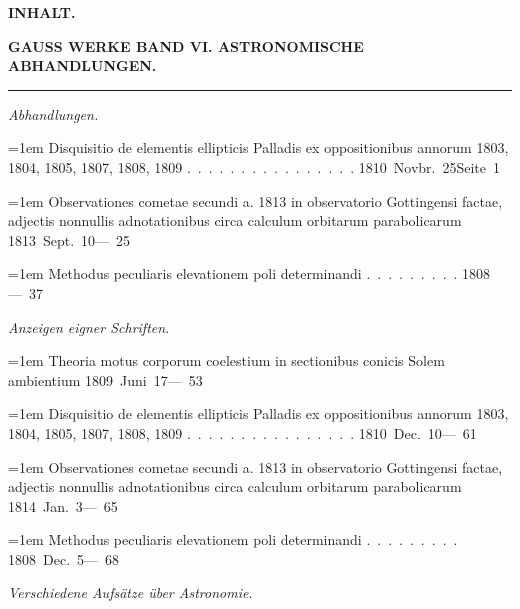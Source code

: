 \clearpage
\begingroup
\pagestyle{empty}
\thispagestyle{empty}
\begingroup
\raggedright
\begin{center}\textbf{INHALT.}\par\medskip
\textbf{GAUSS WERKE BAND VI. ASTRONOMISCHE ABHANDLUNGEN.}\par\medskip
\rule{.07\textwidth}{.3pt}\end{center}
\par\medskip
\noindent\textit{Abhandlungen.}\par\smallskip\nopagebreak[4]
\noindent\hangindent=1em Disquisitio de elementis ellipticis Palladis ex oppositionibus annorum 1803, 1804, 1805, 1807, 1808, 1809 \mbox{.\ .\ .\ .\ .\ .\ .\ .\ .\ .\ .\ .\ .\ .\ .\ .} \hfill\mbox{1810 Novbr. 25}\quad\mbox{Seite 1}\par\smallskip
\noindent\hangindent=1em Observationes cometae secundi a. 1813 in observatorio Gottingensi factae, adjectis nonnullis adnotationibus circa calculum orbitarum parabolicarum \hfill\mbox{1813 Sept. 10}\quad\mbox{--- 25}\par\smallskip
\noindent\hangindent=1em Methodus peculiaris elevationem poli determinandi \mbox{.\ .\ .\ .\ .\ .\ .\ .\ .} \hfill\mbox{1808}\quad\mbox{--- 37}\par\smallskip
\par\medskip
\noindent\textit{Anzeigen eigner Schriften.}\par\smallskip\nopagebreak[4]
\noindent\hangindent=1em Theoria motus corporum coelestium in sectionibus conicis Solem ambientium \hfill\mbox{1809 Juni 17}\quad\mbox{--- 53}\par\smallskip
\noindent\hangindent=1em Disquisitio de elementis ellipticis Palladis ex oppositionibus annorum 1803, 1804, 1805, 1807, 1808, 1809 \mbox{.\ .\ .\ .\ .\ .\ .\ .\ .\ .\ .\ .\ .\ .\ .\ .} \hfill\mbox{1810 Dec. 10}\quad\mbox{--- 61}\par\smallskip
\noindent\hangindent=1em Observationes cometae secundi a. 1813 in observatorio Gottingensi factae, adjectis nonnullis adnotationibus circa calculum orbitarum parabolicarum \hfill\mbox{1814 Jan. 3}\quad\mbox{--- 65}\par\smallskip
\noindent\hangindent=1em Methodus peculiaris elevationem poli determinandi \mbox{.\ .\ .\ .\ .\ .\ .\ .\ .} \hfill\mbox{1808 Dec. 5}\quad\mbox{--- 68}\par\smallskip
\par\medskip
\noindent\textit{Verschiedene Aufsätze über Astronomie.}\par\smallskip\nopagebreak[4]
